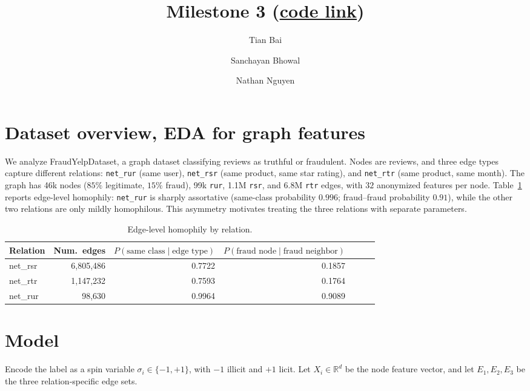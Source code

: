 \documentclass[11pt,reqno]{amsart}
\title[]{Milestone 3 (\href{https://github.com/Sanchayan-Bhowal/BitcoinTransactionClassification}{code link})}
\author[]{Tian Bai}
\author[]{ Sanchayan Bhowal}
\author[]{ Nathan Nguyen}
\begin{document}
\maketitle

\section{Dataset overview, EDA for graph features}

We analyze FraudYelpDataset, a graph dataset classifying reviews as truthful or fraudulent. Nodes are reviews, and three edge types capture different relations: \texttt{net\_rur} (same user), \texttt{net\_rsr} (same product, same star rating), and \texttt{net\_rtr} (same product, same month). The graph has 46k nodes ($85\%$ legitimate, $15\%$ fraud), 99k \texttt{rur}, 1.1M \texttt{rsr}, and 6.8M \texttt{rtr} edges, with $32$ anonymized features per node. Table~\ref{tab:edge_homophily} reports edge-level homophily: \texttt{net\_rur} is sharply assortative (same-class probability $0.996$; fraud--fraud probability $0.91$), while the other two relations are only mildly homophilous. This asymmetry motivates treating the three relations with separate parameters.


\begin{table}[htbp]
  \centering
  \caption{Edge-level homophily by relation.}
  \label{tab:edge_homophily}
  \begin{tabular}{lrrrrrr}
    \toprule
    Relation & Num.\ edges & $P(\text{same class} \mid \text{edge type})$ & $P(\text{fraud node} \mid \text{fraud neighbor})$ \\
    \midrule
    net\_rsr & 6{,}805{,}486 & 0.7722 & 0.1857  \\
    net\_rtr & 1{,}147{,}232 & 0.7593 & 0.1764  \\
    net\_rur &      98{,}630 & 0.9964 & 0.9089\\
    \bottomrule
  \end{tabular}
\end{table}

\section{Model}

Encode the label as a spin variable $\sigma_i \in \{-1,+1\}$, with $-1$ illicit and $+1$ licit. Let $X_i \in \mathbb{R}^d$ be the node feature vector, and let $E_1, E_2, E_3$ be the three relation-specific edge sets.
\end{document}
